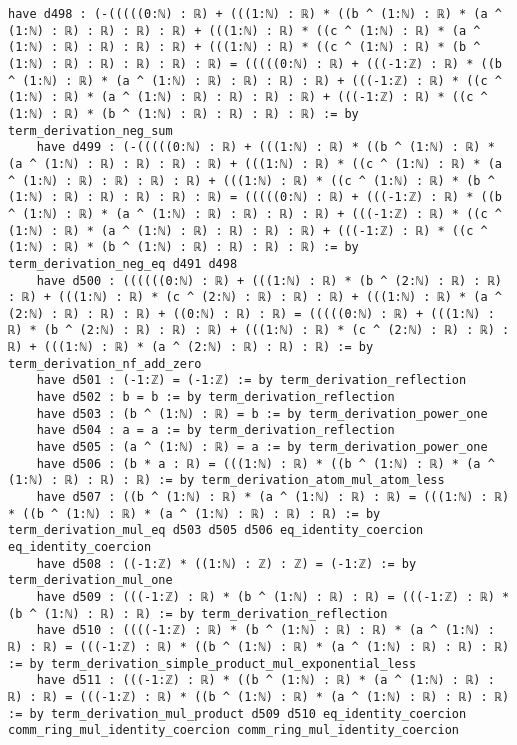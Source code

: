\documentclass{article}
\begin{document}
\begin{tcolorbox}[colback=white!10, width=\linewidth]
\begin{lstlisting}[language=Lean4]
    have d498 : (-(((((0:ℕ) : ℝ) + (((1:ℕ) : ℝ) * ((b ^ (1:ℕ) : ℝ) * (a ^ (1:ℕ) : ℝ) : ℝ) : ℝ) : ℝ) + (((1:ℕ) : ℝ) * ((c ^ (1:ℕ) : ℝ) * (a ^ (1:ℕ) : ℝ) : ℝ) : ℝ) : ℝ) + (((1:ℕ) : ℝ) * ((c ^ (1:ℕ) : ℝ) * (b ^ (1:ℕ) : ℝ) : ℝ) : ℝ) : ℝ) : ℝ) = (((((0:ℕ) : ℝ) + (((-1:ℤ) : ℝ) * ((b ^ (1:ℕ) : ℝ) * (a ^ (1:ℕ) : ℝ) : ℝ) : ℝ) : ℝ) + (((-1:ℤ) : ℝ) * ((c ^ (1:ℕ) : ℝ) * (a ^ (1:ℕ) : ℝ) : ℝ) : ℝ) : ℝ) + (((-1:ℤ) : ℝ) * ((c ^ (1:ℕ) : ℝ) * (b ^ (1:ℕ) : ℝ) : ℝ) : ℝ) : ℝ) := by term_derivation_neg_sum
    have d499 : (-(((((0:ℕ) : ℝ) + (((1:ℕ) : ℝ) * ((b ^ (1:ℕ) : ℝ) * (a ^ (1:ℕ) : ℝ) : ℝ) : ℝ) : ℝ) + (((1:ℕ) : ℝ) * ((c ^ (1:ℕ) : ℝ) * (a ^ (1:ℕ) : ℝ) : ℝ) : ℝ) : ℝ) + (((1:ℕ) : ℝ) * ((c ^ (1:ℕ) : ℝ) * (b ^ (1:ℕ) : ℝ) : ℝ) : ℝ) : ℝ) : ℝ) = (((((0:ℕ) : ℝ) + (((-1:ℤ) : ℝ) * ((b ^ (1:ℕ) : ℝ) * (a ^ (1:ℕ) : ℝ) : ℝ) : ℝ) : ℝ) + (((-1:ℤ) : ℝ) * ((c ^ (1:ℕ) : ℝ) * (a ^ (1:ℕ) : ℝ) : ℝ) : ℝ) : ℝ) + (((-1:ℤ) : ℝ) * ((c ^ (1:ℕ) : ℝ) * (b ^ (1:ℕ) : ℝ) : ℝ) : ℝ) : ℝ) := by term_derivation_neg_eq d491 d498
    have d500 : ((((((0:ℕ) : ℝ) + (((1:ℕ) : ℝ) * (b ^ (2:ℕ) : ℝ) : ℝ) : ℝ) + (((1:ℕ) : ℝ) * (c ^ (2:ℕ) : ℝ) : ℝ) : ℝ) + (((1:ℕ) : ℝ) * (a ^ (2:ℕ) : ℝ) : ℝ) : ℝ) + ((0:ℕ) : ℝ) : ℝ) = (((((0:ℕ) : ℝ) + (((1:ℕ) : ℝ) * (b ^ (2:ℕ) : ℝ) : ℝ) : ℝ) + (((1:ℕ) : ℝ) * (c ^ (2:ℕ) : ℝ) : ℝ) : ℝ) + (((1:ℕ) : ℝ) * (a ^ (2:ℕ) : ℝ) : ℝ) : ℝ) := by term_derivation_nf_add_zero
    have d501 : (-1:ℤ) = (-1:ℤ) := by term_derivation_reflection
    have d502 : b = b := by term_derivation_reflection
    have d503 : (b ^ (1:ℕ) : ℝ) = b := by term_derivation_power_one
    have d504 : a = a := by term_derivation_reflection
    have d505 : (a ^ (1:ℕ) : ℝ) = a := by term_derivation_power_one
    have d506 : (b * a : ℝ) = (((1:ℕ) : ℝ) * ((b ^ (1:ℕ) : ℝ) * (a ^ (1:ℕ) : ℝ) : ℝ) : ℝ) := by term_derivation_atom_mul_atom_less
    have d507 : ((b ^ (1:ℕ) : ℝ) * (a ^ (1:ℕ) : ℝ) : ℝ) = (((1:ℕ) : ℝ) * ((b ^ (1:ℕ) : ℝ) * (a ^ (1:ℕ) : ℝ) : ℝ) : ℝ) := by term_derivation_mul_eq d503 d505 d506 eq_identity_coercion eq_identity_coercion
    have d508 : ((-1:ℤ) * ((1:ℕ) : ℤ) : ℤ) = (-1:ℤ) := by term_derivation_mul_one
    have d509 : (((-1:ℤ) : ℝ) * (b ^ (1:ℕ) : ℝ) : ℝ) = (((-1:ℤ) : ℝ) * (b ^ (1:ℕ) : ℝ) : ℝ) := by term_derivation_reflection
    have d510 : ((((-1:ℤ) : ℝ) * (b ^ (1:ℕ) : ℝ) : ℝ) * (a ^ (1:ℕ) : ℝ) : ℝ) = (((-1:ℤ) : ℝ) * ((b ^ (1:ℕ) : ℝ) * (a ^ (1:ℕ) : ℝ) : ℝ) : ℝ) := by term_derivation_simple_product_mul_exponential_less
    have d511 : (((-1:ℤ) : ℝ) * ((b ^ (1:ℕ) : ℝ) * (a ^ (1:ℕ) : ℝ) : ℝ) : ℝ) = (((-1:ℤ) : ℝ) * ((b ^ (1:ℕ) : ℝ) * (a ^ (1:ℕ) : ℝ) : ℝ) : ℝ) := by term_derivation_mul_product d509 d510 eq_identity_coercion comm_ring_mul_identity_coercion comm_ring_mul_identity_coercion

\end{lstlisting}
\end{tcolorbox}
\end{document}
